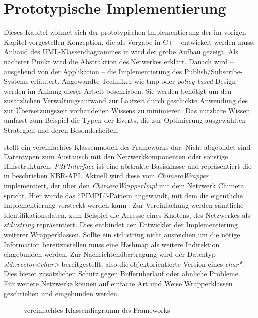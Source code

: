 \chapter{Prototypische Implementierung}
\label{chap:impl}
Dieses Kapitel widmet sich der prototypischen Implementierung der im vorigen Kapitel vorgestellen Konzeption, die als Vorgabe in C++ entwickelt werden muss. Anhand des UML-Klassendiagrammes in  wird der grobe Aufbau gezeigt. Als nächster Punkt wird die Abstraktion des Netwerkes erklärt. Danach wird -- ausgehend von der Applikation -- die Implementierung des Publish/Subscribe-Systems erläutert. Angewandte Techniken wie \ac{tmp} oder \emph{policy based}-Design werden im Anhang dieser Arbeit beschrieben. Sie werden benötigt um den zusätzlichen Verwaltungsaufwand zur Laufzeit durch geschickte Anwendung des zur Übersetzungszeit vorhandenen Wissens zu minimieren. Das nutzbare Wissen umfasst zum Beispiel die Typen der Events, die zur Optimierung ausgewählten Strategien und deren Besonderheiten.

 stellt ein vereinfachtes Klassenmodell des Frameworks dar. Nicht abgebildet sind Datentypen zum Austausch mit den Netzwerkkomponenten oder sonstige Hilfsstrukturen. \emph{P2PInterface} ist eine abstrakte Basisklasse und repräsentiert die in \cite{Dabek2003Towards} beschrieben KBR-API. Aktuell wird diese vom \emph{ChimeraWrapper} implementiert, der über den \emph{ChimeraWrapperImpl} mit dem Netzwerk Chimera spricht. Hier wurde das ``PIMPL''-Pattern angewandt, mit dem die eigentliche Implementierung versteckt werden kann \cite{Alexandrescu2001Modern}. Zur Vereinfachung werden sämtliche Identifikationsdaten, zum Beispiel die Adresse eines Knotens, des Netzwerkes als \emph{std::string} repräsentiert. Dies entbindet den Entwickler der Implementierung weiterer Wrapperklassen. Sollte ein std::string nicht ausreichen um die nötige Information bereitzustellen muss eine Hashmap als weitere Indirektion eingebunden werden. Zur Nachrichtenübertragung wird der Datentyp \emph{std::vector<char>} bereitgestellt, also die objektorientierte Version eines \emph{char*}. Dies bietet zusätzlichen Schutz gegen Bufferüberlauf oder ähnliche Probleme.\\
Für weitere Netzwerke können auf einfache Art und Weise Wrapperklassen geschrieben und eingebunden werden.

\begin{figure}[htbp]
\centering
{}
\caption{vereinfachtes Klassendiagramm des Frameworks}
\label{fig:uml}
\end{figure}



